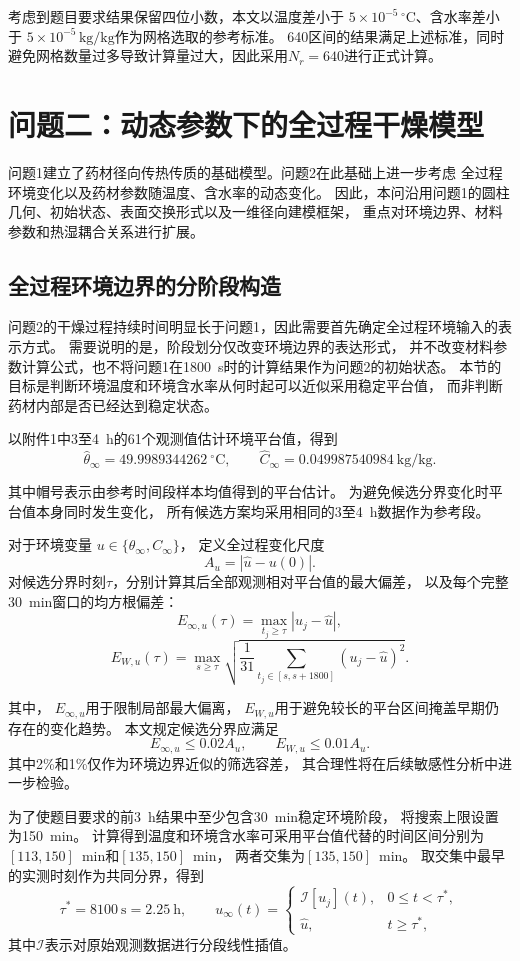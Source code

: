 \documentclass[withoutpreface]{cumcmthesis}
\begin{document}
考虑到题目要求结果保留四位小数，本文以温度差小于
$5\times10^{-5}\,{}^\circ\mathrm{C}$、含水率差小于
$5\times10^{-5}\,\mathrm{kg/kg}$作为网格选取的参考标准。
640区间的结果满足上述标准，同时避免网格数量过多导致计算量过大，因此采用$N_r=640$进行正式计算。


\section{问题二：动态参数下的全过程干燥模型}

问题1建立了药材径向传热传质的基础模型。问题2在此基础上进一步考虑
全过程环境变化以及药材参数随温度、含水率的动态变化。
因此，本问沿用问题1的圆柱几何、初始状态、表面交换形式以及一维径向建模框架，
重点对环境边界、材料参数和热湿耦合关系进行扩展。

\subsection{全过程环境边界的分阶段构造}

问题2的干燥过程持续时间明显长于问题1，因此需要首先确定全过程环境输入的表示方式。
需要说明的是，阶段划分仅改变环境边界的表达形式，
并不改变材料参数计算公式，也不将问题1在1800~s时的计算结果作为问题2的初始状态。
本节的目标是判断环境温度和环境含水率从何时起可以近似采用稳定平台值，
而非判断药材内部是否已经达到稳定状态。

以附件1中3至4~h的61个观测值估计环境平台值，得到
\[
\widehat\theta_\infty=49.9989344262\ ^\circ\mathrm C,
\qquad
\widehat C_\infty=0.049987540984\ \mathrm{kg/kg}.
\]

其中帽号表示由参考时间段样本均值得到的平台估计。
为避免候选分界变化时平台值本身同时发生变化，
所有候选方案均采用相同的3至4~h数据作为参考段。

对于环境变量
$u\in\{\theta_\infty,C_\infty\}$，
定义全过程变化尺度
\[
A_u=|\widehat u-u(0)|.
\]
对候选分界时刻$\tau$，分别计算其后全部观测相对平台值的最大偏差，
以及每个完整30~min窗口的均方根偏差：
\[
E_{\infty,u}(\tau)
=
\max_{t_j\ge\tau}|u_j-\widehat u|,
\]
\[
E_{W,u}(\tau)
=
\max_{s\ge\tau}
\sqrt{
\frac{1}{31}
\sum_{t_j\in[s,s+1800]}
(u_j-\widehat u)^2
}.
\]

其中，
$E_{\infty,u}$用于限制局部最大偏离，
$E_{W,u}$用于避免较长的平台区间掩盖早期仍存在的变化趋势。
本文规定候选分界应满足
\[
E_{\infty,u}\le0.02A_u,
\qquad
E_{W,u}\le0.01A_u.
\]
其中2\%和1\%仅作为环境边界近似的筛选容差，
其合理性将在后续敏感性分析中进一步检验。

为了使题目要求的前3~h结果中至少包含30~min稳定环境阶段，
将搜索上限设置为150~min。
计算得到温度和环境含水率可采用平台值代替的时间区间分别为
$[113,150]$~min和$[135,150]$~min，
两者交集为$[135,150]$~min。
取交集中最早的实测时刻作为共同分界，得到
\begin{equation}\label{eq:q2_boundary}
\tau^*=8100\ \mathrm s=2.25\ \mathrm h,
\qquad
u_\infty(t)=
\begin{cases}
\mathcal I[u_j](t), & 0\le t<\tau^*,\\
\widehat u, & t\ge\tau^*,
\end{cases}
\end{equation}
其中$\mathcal I$表示对原始观测数据进行分段线性插值。
\end{document}
